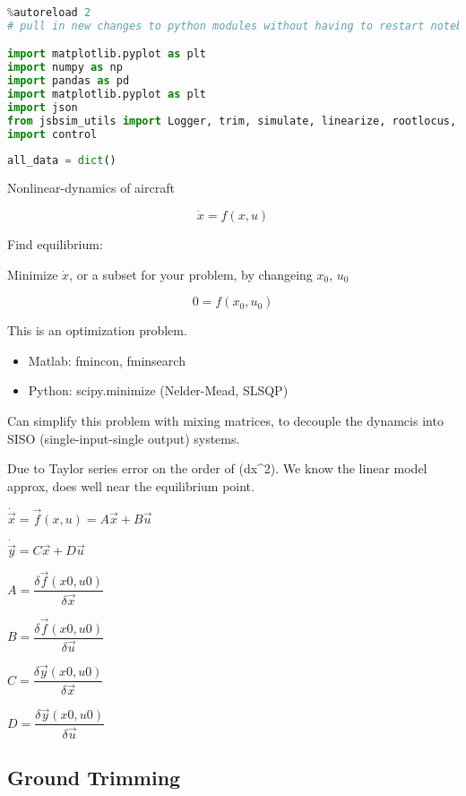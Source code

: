\begin{lstlisting}[language=Python]
%load_ext autoreload
%autoreload 2
# pull in new changes to python modules without having to restart notebook

import matplotlib.pyplot as plt
import numpy as np
import pandas as pd
import matplotlib.pyplot as plt
import json 
from jsbsim_utils import Logger, trim, simulate, linearize, rootlocus, clean_tf
import control 
\end{lstlisting}

\begin{lstlisting}[language=Python]
all_data = dict()
\end{lstlisting}

Nonlinear-dynamics of aircraft

\[\dot{x} = f(x, u)\]

Find equilibrium:

Minimize \(\dot{x}\), or a subset for your problem, by changeing
\(x_0\), \(u_0\)

\[0 = f(x_0, u_0)\]

This is an optimization problem.

\begin{itemize}
\tightlist
\item
  Matlab: fmincon, fminsearch
\item
  Python: scipy.minimize (Nelder-Mead, SLSQP)
\end{itemize}

Can simplify this problem with mixing matrices, to decouple the dynamcis
into SISO (single-input-single output) systems.

Due to Taylor series error on the order of (dx\^{}2). We know the linear
model approx, does well near the equilibrium point.

\(\dot{\vec{x}} = \vec{f}(x, u) = A \vec{x} + B \vec{u}\)

\(\dot{\vec{y}} = C \vec{x} + D \vec{u}\)

\(A = \dfrac{\delta \vec{f}(x0, u0)}{\delta \vec{x}}\)

\(B = \dfrac{\delta \vec{f}(x0, u0)}{\delta \vec{u}}\)

\(C = \dfrac{\delta \vec{y}(x0, u0)}{\delta \vec{x}}\)

\(D = \dfrac{\delta \vec{y}(x0, u0)}{\delta \vec{u}}\)

\hypertarget{ground-trimming}{%
\subsection{Ground Trimming}\label{ground-trimming}}

